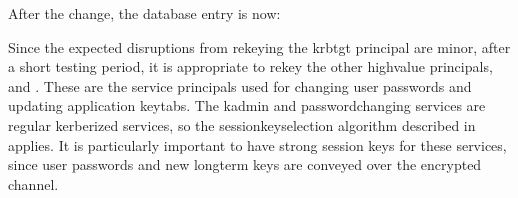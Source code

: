 \documentclass[letterpaper,10pt,english]{sphinxmanual}
\begin{document}
\sphinxAtStartPar
After the change, the database entry is now:

\begin{sphinxVerbatim}[commandchars=\\\{\}]
\PYG{p}{[} \PYG{p}{]}
\PYG{p}{[}\PYG{p}{]}
   
   
   
   
   
   
\PYG{p}{[}\PYG{p}{]}
\end{sphinxVerbatim}

\sphinxAtStartPar
Since the expected disruptions from rekeying the krbtgt principal are
minor, after a short testing period, it is
appropriate to rekey the other high\sphinxhyphen{}value principals, 
and . These are the service principals used for
changing user passwords and updating application keytabs.  The kadmin
and password\sphinxhyphen{}changing services are regular kerberized services, so the
session\sphinxhyphen{}key\sphinxhyphen{}selection algorithm described in {\hyperref[\detokenize{admin/enctypes:session-key-selection}]{}}
applies.  It is particularly important to have strong session keys for
these services, since user passwords and new long\sphinxhyphen{}term keys are conveyed
over the encrypted channel.
\end{document}
